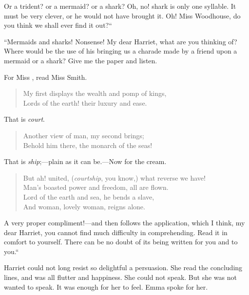Or a trident? or a mermaid? or a shark? Oh, no! shark is only
one syllable.  It must be very clever, or he would not have brought it.
Oh! Miss Woodhouse, do you think we shall ever find it out?``

``Mermaids and sharks! Nonsense! My dear Harriet, what are you
thinking of? Where would be the use of his bringing us a charade made
by a friend upon a mermaid or a shark? Give me the paper and listen.

For Miss \gdash{}, read Miss Smith.

\begin{verse}
    My first displays the wealth and pomp of kings,\\
      Lords of the earth! their luxury and ease.
\end{verse}

That is \emph{court}.

\begin{verse}
    Another view of man, my second brings;\\
      Behold him there, the monarch of the seas!
\end{verse}

That is \emph{ship};---plain as it can be.---Now for the cream.

\begin{verse}
    But ah! united, (\emph{courtship}, you know,) what reverse we have!\\
      Man's boasted power and freedom, all are flown.\\
    Lord of the earth and sea, he bends a slave,\\
      And woman, lovely woman, reigns alone.\\
\end{verse}

A very proper compliment!---and then follows the application,
which I think, my dear Harriet, you cannot find much difficulty
in comprehending.  Read it in comfort to yourself.  There can
be no doubt of its being written for you and to you.``

Harriet could not long resist so delightful a persuasion.
She read the concluding lines, and was all flutter and happiness.
She could not speak.  But she was not wanted to speak.  It was enough
for her to feel.  Emma spoke for her.

